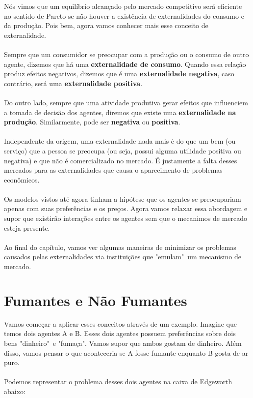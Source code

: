 \documentclass[a4paper,11pt,oneside]{book}
\theoremstyle{definition}
\theoremstyle{break}
\begin{document}
Nós vimos que um equilíbrio alcançado pelo mercado competitivo será eficiente no sentido de Pareto se não houver a existência de externalidades do consumo e da produção. Pois bem, agora vamos conhecer mais esse conceito de externalidade.
\\
\\
Sempre que um consumidor se preocupar com a produção ou o consumo de outro agente, dizemos que há uma \textbf{externalidade de consumo}. Quando essa relação produz efeitos negativos, dizemos que é uma \textbf{externalidade negativa}, caso contrário, será uma \textbf{externalidade positiva}.
\\
\\
Do outro lado, sempre que uma atividade produtiva gerar efeitos que influenciem a tomada de decisão dos agentes, diremos que existe uma \textbf{externalidade na produção}. Similarmente, pode ser \textbf{negativa} ou \textbf{positiva}.
\\
\\
Independente da origem, uma externalidade nada mais é do que um bem (ou serviço) que a pessoa se preocupa (ou seja, possui alguma utilidade positiva ou negativa) e que não é comercializado no mercado. É justamente a falta desses mercados para as externalidades que causa o aparecimento de problemas econômicos.
\\
\\
Os modelos vistos até agora tinham a hipótese que os agentes se preocupariam apenas com suas preferências e os preços. Agora vamos relaxar essa abordagem e supor que existirão interações entre os agentes sem que o mecanimos de mercado esteja presente.
\\
\\
Ao final do capítulo, vamos ver algumas maneiras de minimizar os problemas causados pelas externalidades via instituições que "emulam"\ um mecanismo de mercado.

\section{Fumantes e Não Fumantes}

Vamos começar a aplicar esses conceitos através de um exemplo. Imagine que temos dois agentes A e B. Esses dois agentes possuem preferências sobre dois bens "dinheiro"\ e "fumaça". Vamos supor que ambos gostam de dinheiro. Além disso, vamos pensar o que aconteceria se A fosse fumante enquanto B gosta de ar puro.
\\
\\
Podemos representar o problema desses dois agentes na caixa de Edgeworth abaixo:
\end{document}
